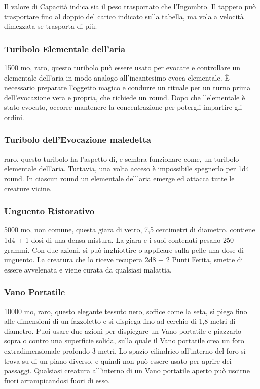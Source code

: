 \begin{multicols}{2}
\medskip
Il valore di Capacità indica sia il peso trasportato che l'Ingombro. Il tappeto può trasportare fino al doppio del carico indicato sulla tabella, ma vola a velocità dimezzata se trasporta di più.

\subsubsection*{Turibolo Elementale dell’aria}
1500 mo, raro, questo turibolo può essere usato per evocare e controllare un elementale dell’aria in modo analogo all’incantesimo evoca elementale. È necessario preparare l'oggetto magico e condurre un rituale per un turno prima dell’evocazione vera e propria, che richiede un round. Dopo che l’elementale è stato evocato, occorre mantenere la concentrazione per potergli impartire gli ordini.

\subsubsection*{Turibolo dell’Evocazione maledetta}
raro, questo turibolo ha l'aspetto di, e sembra funzionare come, un turibolo elementale dell’aria. Tuttavia, una volta acceso è impossibile spegnerlo per 1d4 round. In ciascun round un elementale dell’aria emerge ed attacca tutte le creature vicine.

\subsubsection*{Unguento Ristorativo}
5000 mo, non comune, questa giara di vetro, 7,5 centimetri di diametro, contiene 1d4 + 1 dosi di una densa mistura. La giara e i suoi contenuti pesano 250 grammi. Con due azioni, si può inghiottire o applicare sulla pelle una dose di unguento. La creatura che lo riceve recupera 2d8 + 2 Punti Ferita, smette di essere avvelenata e viene curata da qualsiasi malattia.

\subsubsection*{Vano Portatile}
10000 mo, raro, questo elegante tessuto nero, soffice come la seta, si piega fino alle dimensioni di un fazzoletto e si dispiega fino ad cerchio di 1,8 metri di diametro. Puoi usare due azioni per dispiegare un Vano portatile e piazzarlo sopra o contro una superficie solida, sulla quale il Vano portatile crea un foro extradimensionale profondo 3 metri. Lo spazio cilindrico all'interno del foro si trova su di un piano diverso, e quindi non può essere usato per aprire dei passaggi. Qualsiasi creatura all'interno di un Vano portatile aperto può uscirne fuori arrampicandosi fuori di esso.


\end{multicols}
